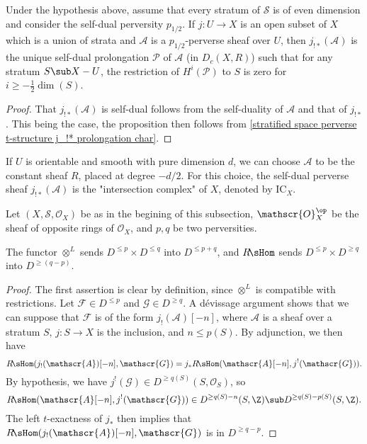 \begin{proposition}\label{stratified space constructible self-dual perverse prolongation char}
Under the hypothesis above, assume that every stratum of $\mathcal{S}$ is of even dimension and consider the self-dual perversity $p_{1/2}$. If $j:U\to X$ is an open subset of $X$ which is a union of strata and $\mathscr{A}$ is a $p_{1/2}$-perverse sheaf over $U$, then $j_{!*}(\mathscr{A})$ is the unique self-dual prolongation $\mathscr{P}$ of $\mathscr{A}$ (in $D_c(X,R)$) such that for any stratum $S\sub X-U$, the restriction of $H^i(\mathscr{P})$ to $S$ is zero for $i\geq-\frac{1}{2}\dim(S)$.  
\end{proposition}
\begin{proof}
That $j_{!*}(\mathscr{A})$ is self-dual follows from the self-duality of $\mathscr{A}$ and that of $j_{!*}$. This being the case, the proposition then follows from \cref{stratified space perverse t-structure j_!* prolongation char}.
\end{proof}

\begin{remark}
If $U$ is orientable and smooth with pure dimension $d$, we can choose $\mathscr{A}$ to be the constant sheaf $R$, placed at degree $-d/2$. For this choice, the self-dual perverse sheaf $j_{!*}(\mathscr{A})$ is the "intersection complex" of $X$, denoted by $\mathrm{IC}_X$.
\end{remark}

Let $(X,\mathcal{S},\mathscr{O}_X)$ be as in the begining of this subsection, $\mathscr{O}_X^{\op}$ be the sheaf of opposite rings of $\mathscr{O}_X$, and $p,q$ be two perversities.
\begin{proposition}\label{stratified space perverse structure and tensor Hom}
The functor $\otimes^L$ sends $D^{\leq p}\times D^{\leq q}$ into $D^{\leq p+q}$, and $R\!\sHom$ sends $D^{\leq p}\times D^{\geq q}$ into $D^{\geq (q-p)}$.
\end{proposition}
\begin{proof}
The first assertion is clear by definition, since $\otimes^L$ is compatible with restrictions. Let $\mathscr{F}\in D^{\leq p}$ and $\mathscr{G}\in D^{\geq q}$. A d\'evissage argument shows that we can suppose that $\mathscr{F}$ is of the form $j_!(\mathscr{A})[-n]$, where $\mathscr{A}$ is a sheaf over a stratum $S$, $j:S\to X$ is the inclusion, and $n\leq p(S)$. By adjunction, we then have
\[R\!\sHom(j_!(\mathscr{A})[-n],\mathscr{G})=j_*R\!\sHom(\mathscr{A}[-n],j^!(\mathscr{G})).\]
By hypothesis, we have $j^!(\mathscr{G})\in D^{\geq q(S)}(S,\mathscr{O}_S)$, so
\[R\!\sHom(\mathscr{A}[-n],j^!(\mathscr{G}))\in D^{\geq q(S)-n}(S,\Z)\sub D^{\geq q(S)-p(S)}(S,\Z).\]
The left $t$-exactness of $j_*$ then implies that $R\!\sHom(j_!(\mathscr{A})[-n],\mathscr{G})$ is in $D^{\geq q-p}$.
\end{proof}

